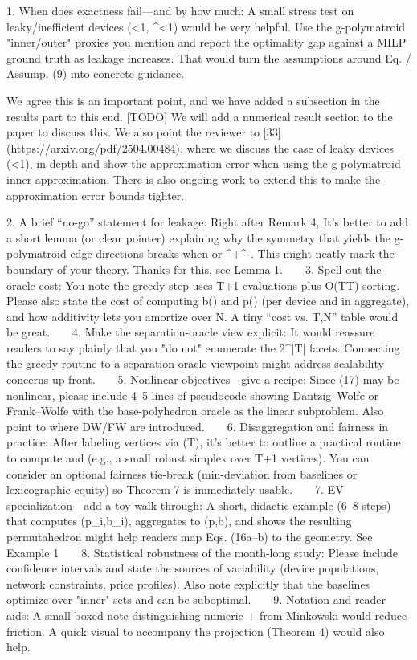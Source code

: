 1. When does exactness fail—and by how much: A small stress test on leaky/inefficient devices (\lambda<1, \eta^\pm<1) would be very helpful. Use the g-polymatroid "inner/outer" proxies you mention and report the optimality gap against a MILP ground truth as leakage increases. That would turn the assumptions around Eq. / Assump. (9) into concrete guidance.

We agree this is an important point, and we have added a subsection in the results part to this end. 
[TODO] We will add a numerical result section to the paper to discuss this.
We also point the reviewer to [33] (https://arxiv.org/pdf/2504.00484), where we discuss the case of leaky devices (\lambda<1), in depth and show the approximation error when using the g-polymatroid inner approximation. There is also ongoing work to extend this to make the approximation error bounds tighter.

2. A brief “no-go” statement for leakage: Right after Remark 4, It's better to add a short lemma (or clear pointer) explaining why the symmetry that yields the g-polymatroid edge directions breaks when \lambda{} or \eta^+\neq\eta^-. This might neatly mark the boundary of your theory.
Thanks for this, see Lemma 1.
   
3. Spell out the oracle cost: You note the greedy step uses T{+}1 evaluations plus O(T\log T) sorting. Please also state the cost of computing b(\cdot) and p(\cdot) (per device and in aggregate), and how additivity lets you amortize over N. A tiny “cost vs. T,N” table would be great.
   
4. Make the separation-oracle view explicit: It would reassure readers to say plainly that you "do not" enumerate the 2^{|T|} facets. Connecting the greedy routine to a separation-oracle viewpoint might address scalability concerns up front.
   
5. Nonlinear objectives—give a recipe: Since (17) may be nonlinear, please include 4–5 lines of pseudocode showing Dantzig–Wolfe or Frank–Wolfe with the base-polyhedron oracle as the linear subproblem. Also point to where DW/FW are introduced.
   
6. Disaggregation and fairness in practice: After labeling vertices via (\tilde T), it's better to outline a practical routine to compute \lambda and \Pi (e.g., a small robust simplex over T{+}1 vertices). You can consider an optional fairness tie-break (min-deviation from baselines or lexicographic equity) so Theorem 7 is immediately usable.
   
7. EV specialization—add a toy walk-through: A short, didactic example (6–8 steps) that computes (p_i,b_i), aggregates to (p,b), and shows the resulting permutahedron might help readers map Eqs. (16a–b) to the geometry.
See Example 1
   
8. Statistical robustness of the month-long study: Please include confidence intervals and state the sources of variability (device populations, network constraints, price profiles). Also note explicitly that the baselines optimize over "inner" sets and can be suboptimal.
   
9. Notation and reader aids: A small boxed note distinguishing numeric + from Minkowski \oplus would reduce friction. A quick visual to accompany the projection (Theorem 4) would also help.

